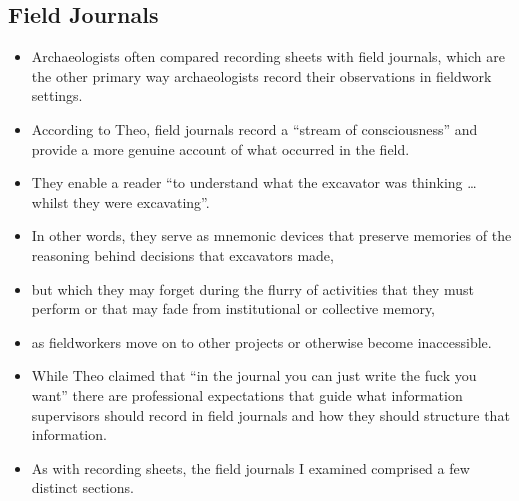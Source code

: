 \documentclass{article}
\begin{document}
\subsection{Field Journals}
\begin{itemize}
  \item Archaeologists often compared recording sheets with field journals, which are the other primary way archaeologists record their observations in fieldwork settings.

  \item According to Theo, field journals record a ``stream of consciousness'' and provide a more genuine account of what occurred in the field.
  \item They enable a reader ``to understand what the excavator was thinking … whilst they were excavating''.\\
  
  \item In other words, they serve as mnemonic devices that preserve memories of the reasoning behind decisions that excavators made,
  \item but which they may forget during the flurry of activities that they must perform or that may fade from institutional or collective memory,
  \item as fieldworkers move on to other projects or otherwise become inaccessible.\\
  
  \item While Theo claimed that ``in the journal you can just write the fuck you want'' there are professional expectations that guide what information supervisors should record in field journals and how they should structure that information.
  \item As with recording sheets, the field journals I examined comprised a few distinct sections.\\
  

\end{itemize}
\end{document}

